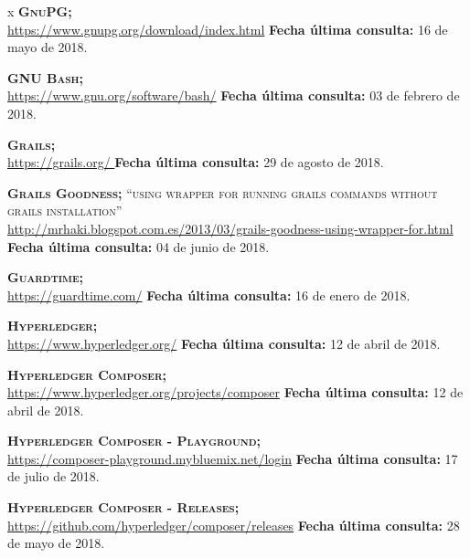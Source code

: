 \begin{thebibliography} {x}
	 \textsc{\textbf{GnuPG; }} \\ 
	\url{https://www.gnupg.org/download/index.html}
	\newline \textbf{Fecha última consulta:} 16 de mayo de 2018.
				
	 \textsc{\textbf{GNU Bash; }} \\ 
	\url{https://www.gnu.org/software/bash/}
	\newline \textbf{Fecha última consulta:} 03 de febrero de 2018.
		
	 \textsc{\textbf{Grails; }} \\ 
	\url{https://grails.org/	}
	\newline \textbf{Fecha última consulta:} 29 de agosto de 2018.
		
	 \textsc{\textbf{Grails Goodness; }}\textsc{“using wrapper for running grails commands without grails installation”} \\ 
	\url{http://mrhaki.blogspot.com.es/2013/03/grails-goodness-using-wrapper-for.html} 
	\newline \textbf{Fecha última consulta:} 04 de junio de 2018.
	
	 \textsc{\textbf{Guardtime; }} \\ 
	\url{https://guardtime.com/}
	\newline \textbf{Fecha última consulta:} 16 de enero de 2018.
		
	 \textsc{\textbf{Hyperledger; }} \\ 
	\url{https://www.hyperledger.org/} 
	\newline \textbf{Fecha última consulta:} 12 de abril de 2018.

	 \textsc{\textbf{Hyperledger Composer; }} \\ 
	\url{https://www.hyperledger.org/projects/composer} 
	\newline \textbf{Fecha última consulta:} 12 de abril de 2018.
	
	 \textsc{\textbf{Hyperledger Composer - Playground; }} \\ 
	\url{https://composer-playground.mybluemix.net/login} 
	\newline \textbf{Fecha última consulta:} 17 de julio de 2018.
	
	 \textsc{\textbf{Hyperledger Composer - Releases; }} \\ 
	\url{https://github.com/hyperledger/composer/releases} 
	\newline \textbf{Fecha última consulta:} 28 de mayo de 2018.
		

\end{thebibliography}
